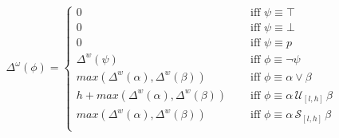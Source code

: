 \begin{align*}
\Delta^{\omega}(\phi) = \left\lbrace
\begin{aligned}
0 & \quad \text{ iff } \psi \equiv \top \\
0 & \quad \text{ iff } \psi \equiv \bot \\
0 & \quad \text{ iff } \psi \equiv p \\
\Delta^w(\psi) & \quad \text{ iff } \phi \equiv \neg \psi \\
max(\Delta^w(\alpha),\Delta^w(\beta)) & \quad \text{ iff } \phi \equiv \alpha \vee \beta \\
h + max(\Delta^w(\alpha),\Delta^w(\beta)) & \quad \text{ iff } \phi \equiv \alpha\, \mathcal{U}_{[l,h]}\, \beta \\
max(\Delta^w(\alpha),\Delta^w(\beta)) & \quad \text{ iff } \phi \equiv \alpha\, \mathcal{S}_{[l,h]}\, \beta \\
\end{aligned} \right. 
\end{align*}


